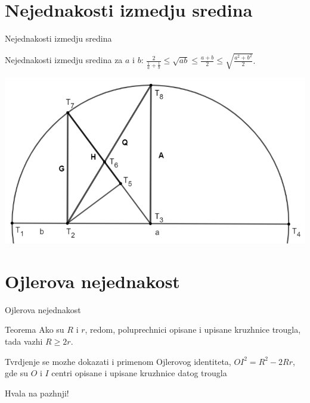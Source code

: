 \documentclass{beamer}
\newcommand{\D}{\displaystyle}
\begin{document}
\section{Nejednakosti izmedju sredina}
\begin{frame}{Nejednakosti izmedju sredina}

\begin{block}{Nejednakosti izmedju sredina za $a$ i $b$:}
\centering $\D\frac{2}{\frac{1}{a}+\frac{1}{b}}\leq\sqrt{ab}\leq\frac{a+b}{2}\leq\sqrt{\frac{a^2+b^2}{2}}$.
\end{block}
\centering
\includegraphics[scale=0.35]{NZM}
\end{frame}


\section{Ojlerova nejednakost}
\begin{frame}{Ojlerova nejednakost}
    \begin{block}{Teorema}
    Ako su $R$ i $r$, redom, poluprechnici opisane i upisane kruzhnice trougla, tada vazhi $R\geq 2r.$
    \end{block}
    \begin{block}{}
    Tvrdjenje se mozhe dokazati i primenom Ojlerovog identiteta, $OI^2 = R^2 - 2Rr$, gde su $O$ i $I$ centri opisane i upisane kruzhnice datog trougla
    \end{block}
\end{frame}

\begin{frame}
 \centering\LARGE   Hvala na pazhnji!
\end{frame}
\end{document}
